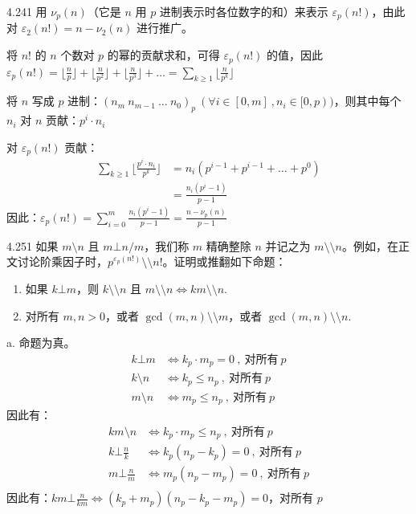 \begin{problem}{4.24}{1}
  用 \( \nu_p (n) \)（它是 \( n \) 用 \( p \) 进制表示时各位数字的和）来表示 \( \varepsilon_p (n!) \)，由此对 \( \varepsilon_2 (n!) = n - \nu_2 (n) \) 进行推广。
\end{problem}

将 \( n! \) 的 \( n \) 个数对 \( p \) 的幂的贡献求和，可得 \( \varepsilon_p (n!) \) 的值，因此 \( \varepsilon_p (n!) = \lfloor \frac{n}{p} \rfloor + \lfloor \frac{n}{p^2} \rfloor + \lfloor \frac{n}{p^3} \rfloor + \dots = \sum_{k \ge 1} \lfloor \frac{n}{p^k} \rfloor \)

将 \( n \) 写成 \( p \) 进制：\( (n_m \ n_{m-1} \ \dots \ n_0)_p \ (\forall i \in [0,m] \ , n_i \in [0,p)) \)，则其中每个 \( n_i \) 对 \( n \) 贡献：\( p^{i} \cdot n_i \)

对 \( \varepsilon_p (n!) \) 贡献：
\begin{align*}
  \sum_{k \ge 1} \lfloor \frac{p^i \cdot n_i}{p^k} \rfloor &= n_i (p^{i-1} + p^{i-1} + \dots + p^0) \\
  &= \frac{n_i (p^i - 1)}{p - 1}
\end{align*}
因此：\( \varepsilon_p (n!) = \sum_{i = 0}^m \frac{n_i (p^i - 1)}{p - 1} = \frac{n - \nu_p (n)}{p-1} \)

\begin{problem}{4.25}{1}
  如果 \( m \setminus n \) 且 \( m \bot n / m \)，我们称 \( m \) 精确整除 \( n \) 并记之为 \( m \setminus \setminus n \)。例如，在正文讨论阶乘因子时，\( p^{\varepsilon_p (n!)} \setminus \setminus n! \)。证明或推翻如下命题：
  \begin{enumerate}
    \item[a] 如果 \( k \bot m \)，则 \( k \setminus \setminus n \) 且 \( m \setminus \setminus n \Leftrightarrow km \setminus \setminus n \).
    \item[b] 对所有 \( m,n > 0 \)，或者 \( \gcd(m,n) \setminus \setminus m \)，或者 \( \gcd(m,n) \setminus \setminus n \).
  \end{enumerate}
\end{problem}

a. 命题为真。
\begin{align*}
  k \bot m &\Leftrightarrow k_p \cdot m_p = 0 \ , \ \text{对所有} \ p \\
  k \setminus n &\Leftrightarrow k_p \le n_p \ , \ \text{对所有} \ p \\
  m \setminus n &\Leftrightarrow m_p \le n_p \ , \ \text{对所有} \ p
\end{align*}
因此有：
\begin{align*}
  km \setminus n &\Leftrightarrow k_p \cdot m_p \le n_p \ , \ \text{对所有} \ p \\
  k \bot \frac{n}{k} &\Leftrightarrow k_p (n_p - k_p) = 0 \ , \ \text{对所有} \ p \\
  m \bot \frac{n}{m} &\Leftrightarrow m_p (n_p - m_p) = 0 \ , \ \text{对所有} \ p \\
\end{align*}
因此有：\( km \bot \frac{n}{km} \Leftrightarrow (k_p + m_p) (n_p - k_p - m_p) = 0 \)，对所有 \( p \)

